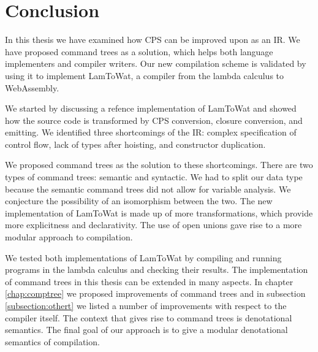 \chapter{\label{chap:conclusion}Conclusion}

In this thesis we have examined how CPS can be improved upon as an IR. We have proposed command trees as a solution, which helps both language implementers and compiler writers. Our new compilation scheme is validated by using it to implement LamToWat, a compiler from the lambda calculus to WebAssembly. 

We started by discussing a refence implementation of LamToWat and showed how the source code is transformed by CPS conversion, closure conversion, and emitting. We identified three shortcomings of the IR: complex specification of control flow, lack of types after hoisting, and constructor duplication.

We proposed command trees as the solution to these shortcomings. There are two types of command trees: semantic and syntactic. We had to split our data type because the semantic command trees did not allow for variable analysis. We conjecture the possibility of an isomorphism between the two. The new implementation of LamToWat is made up of more transformations, which provide more explicitness and declarativity. The use of open unions gave rise to a more modular approach to compilation.

We tested both implementations of LamToWat by compiling and running programs in the lambda calculus and checking their results. The implementation of command trees in this thesis can be extended in many aspects. In chapter \ref{chap:comptree} we proposed improvements of command trees and in subsection \ref{subsection:othert} we listed a number of improvements with respect to the compiler itself. The context that gives rise to command trees is denotational semantics. The final goal of our approach is to give a modular denotational semantics of compilation. 